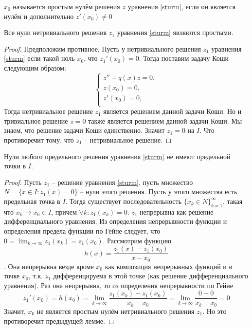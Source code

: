 \documentclass[document.tex]{subfiles}
\begin{document}
\begin{definition}
    $x_0$ называется простым нулём решения $z$ уравнения \ref{sturm}, если он является нулём и дополнительно $z'(x_0) \neq 0$
\end{definition}

\begin{lemma}
    \label{good_lemma}
    Все нули нетривиального решения $z_1$ уравнения \ref{sturm} являются простыми.
\end{lemma}

\begin{proof}
    Предположим противное. Пусть у нетривиального решения $z_1$ уравнения \ref{sturm} если такой ноль $x_0$, что $z_1'(x_0) = 0$. Тогда
    поставим задачу Коши следующим образом:
    \[
        \begin{cases}
            z'' + q(x)z = 0, \\
            z(x_0) = 0, \\
            z'(x_0) = 0, \\
        \end{cases}
    \]
    Тогда нетривиальное решение $z_1$ является решением данной задачи Коши. Но и тривиальное решение $z = 0$ также
    является решением данной задачи Коши. Мы знаем, что решение задачи Коши единственно. Значит $z_1 = 0$ на $I$. Что
    противоречит тому, что $z_1$ -- нетривиальное решение. 
\end{proof}

\begin{lemma}
    Нули любого предельного решения уравнения \ref{sturm} не имеют предельной точки в $I$.
\end{lemma}

\begin{proof}
    Пусть $z_1$ -- решение уравнения \ref{sturm}, пусть множество $N = \{x \in I: z_1(x) = 0\}$ -- нули этого решения. Пусть у
    этого множества есть предельная точка в $I$. Тогда существует последовательность $\{x_k \in N\}_{k = 1}^{\infty}$,
    такая что $x_k \rightarrow x_0 \in I$, причем $\forall k: z_1(x_k) = 0$.
    $z_1$ непрерывна как решение дифференциального уравнения. Из определения непрерывности функции и определения предела
    функции по Гейне следует, что 
    $0 = \lim_{k \rightarrow \infty} z_1(x_k) = z_1(x_0)$.
    Рассмотрим функцию 
    \[
        h(x) = \frac{z_1(x) - z_1(x_0)}{x - x_0}
    \]. Она непрерывна везде кроме $x_0$ как композиция непрерывных функций и в точке $x_0$, т.к. $z_1$ дифференцируема
    в этой точке (как решение дифференциального уравнения). Раз она непрерывна, то из определения непрерывности по Гейне
    \[
        z_1'(x_0) = h(x_0) = \lim_{k \rightarrow \infty} \frac{z_1(x_k) - z_1(x_0)}{x_k - x_0} = \lim_{k \rightarrow
        \infty} \frac{0 - 0}{x_k - x_0} = 0
    \]
    Значит, $x_0$ не является простым нулём нетривиального решения $z_1$. Но это противоречит предыдущей лемме.
\end{proof}
\end{document}
